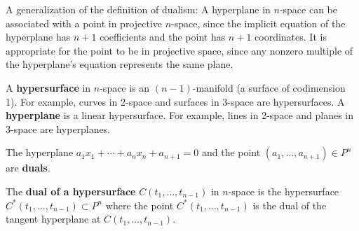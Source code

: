 A generalization of the definition of dualism:
A hyperplane in $n$-space can be associated with a point in projective 
$n$-space, since the implicit equation of the hyperplane has $n+1$ coefficients 
and the point has $n+1$ coordinates.
It is appropriate for the point to be in projective space,
since any nonzero multiple of the hyperplane's equation represents the same plane.
%
\begin{defn2}
A {\bf hypersurface} in $n$-space is an $(n-1)$-manifold (a surface of codimension 1).
For example, curves in 2-space and surfaces in 3-space are hypersurfaces.
A {\bf hyperplane} is a linear hypersurface.
For example, lines in 2-space and planes in 3-space are hyperplanes.
\end{defn2}
%
\begin{defn2}
The hyperplane $a_1x_1+\cdots+a_nx_n+a_{n+1}=0$ %
and the point $(a_1,\ldots,a_{n+1}) \in P^n$ are {\bf duals}.
\end{defn2}
%
\begin{defn2}
The {\bf dual of a hypersurface} $C(t_1,\ldots,t_{n-1})$ in $n$-space is the
hypersurface \linebreak $C^*(t_1,\ldots,t_{n-1}) \subset P^n$ where the point 
$C^*(t_1,\ldots,t_{n-1})$ is the dual 
of the tangent hyperplane at $C(t_1,\ldots,t_{n-1})$. 
\end{defn2}



